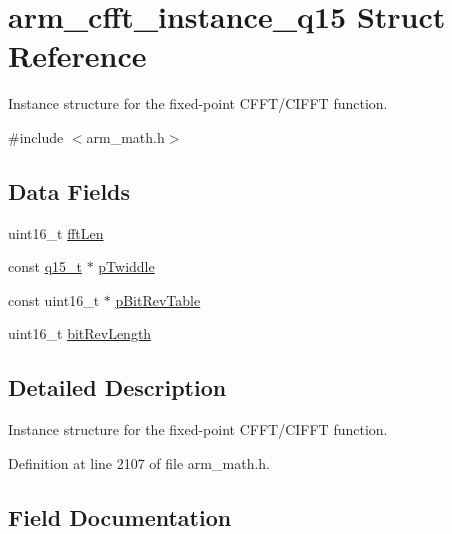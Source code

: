 \hypertarget{structarm__cfft__instance__q15}{}\section{arm\+\_\+cfft\+\_\+instance\+\_\+q15 Struct Reference}
\label{structarm__cfft__instance__q15}


Instance structure for the fixed-\/point C\+F\+F\+T/\+C\+I\+F\+FT function.  




{\ttfamily \#include $<$arm\+\_\+math.\+h$>$}

\subsection*{Data Fields}
\begin{DoxyCompactItemize}
\item 
uint16\+\_\+t \hyperlink{structarm__cfft__instance__q15_ab8db3bbe7c61e6bb8ca2a55e3446e11a}{fft\+Len}
\item 
const \hyperlink{arm__math_8h_ab5a8fb21a5b3b983d5f54f31614052ea}{q15\+\_\+t} $\ast$ \hyperlink{structarm__cfft__instance__q15_a7f19217cfa0370f9e518caa882265386}{p\+Twiddle}
\item 
const uint16\+\_\+t $\ast$ \hyperlink{structarm__cfft__instance__q15_a3b229432d381b0a511a9cdbe3aa74e78}{p\+Bit\+Rev\+Table}
\item 
uint16\+\_\+t \hyperlink{structarm__cfft__instance__q15_a65e1b3e327b8fab9404287ed8f347cc8}{bit\+Rev\+Length}
\end{DoxyCompactItemize}


\subsection{Detailed Description}
Instance structure for the fixed-\/point C\+F\+F\+T/\+C\+I\+F\+FT function. 

Definition at line 2107 of file arm\+\_\+math.\+h.



\subsection{Field Documentation}

